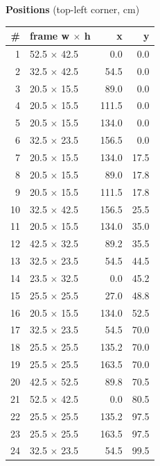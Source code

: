 \documentclass[a4paper,landscape,10pt]{article}
\begin{document}
\begin{minipage}[t]{0.25\textwidth}
\vspace{8pt}
{\bfseries Positions} (top-left corner, cm)\\[2pt]
\tiny
\begin{tabular}{@{}r l r r@{}}
\toprule
\# & frame w $\times$ h & x & y \\
\midrule
1 & 52.5 $\times$ 42.5 & 0.0 & 0.0 \\
2 & 32.5 $\times$ 42.5 & 54.5 & 0.0 \\
3 & 20.5 $\times$ 15.5 & 89.0 & 0.0 \\
4 & 20.5 $\times$ 15.5 & 111.5 & 0.0 \\
5 & 20.5 $\times$ 15.5 & 134.0 & 0.0 \\
6 & 32.5 $\times$ 23.5 & 156.5 & 0.0 \\
7 & 20.5 $\times$ 15.5 & 134.0 & 17.5 \\
8 & 20.5 $\times$ 15.5 & 89.0 & 17.8 \\
9 & 20.5 $\times$ 15.5 & 111.5 & 17.8 \\
10 & 32.5 $\times$ 42.5 & 156.5 & 25.5 \\
11 & 20.5 $\times$ 15.5 & 134.0 & 35.0 \\
12 & 42.5 $\times$ 32.5 & 89.2 & 35.5 \\
13 & 32.5 $\times$ 23.5 & 54.5 & 44.5 \\
14 & 23.5 $\times$ 32.5 & 0.0 & 45.2 \\
15 & 25.5 $\times$ 25.5 & 27.0 & 48.8 \\
16 & 20.5 $\times$ 15.5 & 134.0 & 52.5 \\
17 & 32.5 $\times$ 23.5 & 54.5 & 70.0 \\
18 & 25.5 $\times$ 25.5 & 135.2 & 70.0 \\
19 & 25.5 $\times$ 25.5 & 163.5 & 70.0 \\
20 & 42.5 $\times$ 52.5 & 89.8 & 70.5 \\
21 & 52.5 $\times$ 42.5 & 0.0 & 80.5 \\
22 & 25.5 $\times$ 25.5 & 135.2 & 97.5 \\
23 & 25.5 $\times$ 25.5 & 163.5 & 97.5 \\
24 & 32.5 $\times$ 23.5 & 54.5 & 99.5 \\
\bottomrule
\end{tabular}
\end{minipage}
\clearpage
\end{document}
